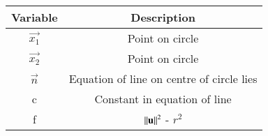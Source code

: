 \begin{tabular}[12pt]{ |c| c|}
    \hline
    \textbf{Variable} & \textbf{Description} \\ 
    \hline
    $\vec{x_1}$ & Point on circle \\
    \hline
    $\vec{x_2}$ & Point on circle \\
    \hline 
    $\vec{n}$ &  Equation of line on centre of circle lies \\
    \hline
    c & Constant in equation of line\\
    \hline
    f & $\left\lVert\mathbf{u}\right\rVert^2$ - $r^2$ \\ 
    \hline   
    \end{tabular}
